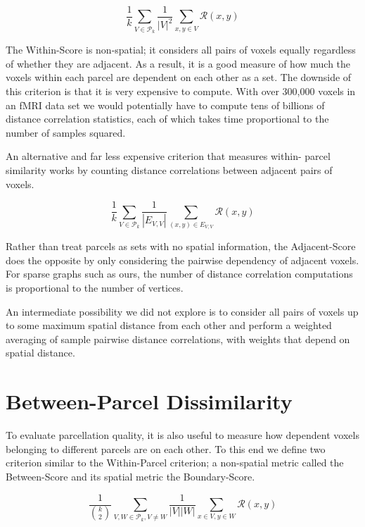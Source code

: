 \begin{definition} \label{within-score}
\[ \frac{1}{k} \sum_{V \in \mathcal{P}_k}
   \frac{1}{|V|^2} \sum_{x,y \in V} \mathcal{R}(x,y)
\]
\end{definition}

The Within-Score is non-spatial; it considers all pairs of voxels
equally regardless of whether they are adjacent. As a result, it is a
good measure of how much the voxels within each parcel are dependent on
each other as a set. The downside of this criterion is that it is very
expensive to compute. With over 300,000 voxels in an fMRI data set we
would potentially have to compute tens of billions of distance
correlation statistics, each of which takes time proportional to the
number of samples squared.

An alternative and far less expensive criterion that measures within-
parcel similarity works by counting distance correlations between
adjacent pairs of voxels.

\begin{definition} \label{adjacent-score}
\[ \frac{1}{k} \sum_{V \in \mathcal{P}_k}
   \frac{1}{|E_{V,V}|} \sum_{(x,y) \in E_{V,V}} \mathcal{R}(x,y)
\]
\end{definition}

Rather than treat parcels as sets with no spatial information, the
Adjacent-Score does the opposite by only considering the pairwise
dependency of adjacent voxels. For sparse graphs such as ours, the number
of distance correlation computations is proportional to the number of
vertices.

An intermediate possibility we did not explore is to consider all pairs
of voxels up to some maximum spatial distance from each other and
perform a weighted averaging of sample pairwise distance correlations,
with weights that depend on spatial distance.

\section{Between-Parcel Dissimilarity}

To evaluate parcellation quality, it is also useful to measure how
dependent voxels belonging to different parcels are on each other. To
this end we define two criterion similar to the Within-Parcel criterion;
a non-spatial metric called the Between-Score and its spatial metric
the Boundary-Score.

\begin{definition} \label{between-score}
\[ \frac{1}{\binom{k}{2}} \sum_{V, W \in \mathcal{P}_k, V \neq W}
   \frac{1}{|V||W|} \sum_{x \in V, y \in W} \mathcal{R}(x,y)
\]
\end{definition}

